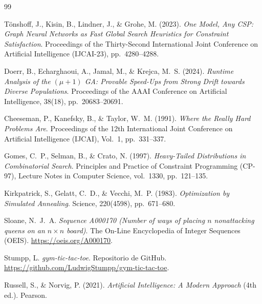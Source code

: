 \documentclass[11pt,onecolumn,letterpaper]{article}
\begin{document}
\begin{thebibliography}{99}

T\"onshoff, J., Kisin, B., Lindner, J., \& Grohe, M. (2023).
\emph{One Model, Any CSP: Graph Neural Networks as Fast Global Search Heuristics for
Constraint Satisfaction}. Proceedings of the Thirty-Second International Joint Conference
on Artificial Intelligence (IJCAI-23), pp.~4280--4288.

Doerr, B., Echarghaoui, A., Jamal, M., \& Krejca, M.~S. (2024).
\emph{Runtime Analysis of the $(\mu+1)$ GA: Provable Speed-Ups from Strong Drift towards
Diverse Populations}. Proceedings of the AAAI Conference on Artificial Intelligence,
38(18), pp.~20683--20691.

Cheeseman, P., Kanefsky, B., \& Taylor, W.~M. (1991).
\emph{Where the Really Hard Problems Are}. Proceedings of the 12th International Joint
Conference on Artificial Intelligence (IJCAI), Vol.~1, pp.~331--337.

Gomes, C.~P., Selman, B., \& Crato, N. (1997).
\emph{Heavy-Tailed Distributions in Combinatorial Search}. Principles and Practice of
Constraint Programming (CP-97), Lecture Notes in Computer Science, vol.~1330, pp.~121--135.

Kirkpatrick, S., Gelatt, C.~D., \& Vecchi, M.~P. (1983).
\emph{Optimization by Simulated Annealing}. Science, 220(4598), pp.~671--680.

Sloane, N.~J.~A. \emph{Sequence A000170 (Number of ways of placing $n$ nonattacking queens
on an $n\times n$ board)}. The On-Line Encyclopedia of Integer Sequences (OEIS).
\url{https://oeis.org/A000170}.

Stumpp, L. \emph{gym-tic-tac-toe}. Repositorio de GitHub.
\url{https://github.com/LudwigStumpp/gym-tic-tac-toe}.

Russell, S., \& Norvig, P. (2021). \emph{Artificial Intelligence: A Modern Approach}
(4th ed.). Pearson.

\end{thebibliography}
\end{document}

